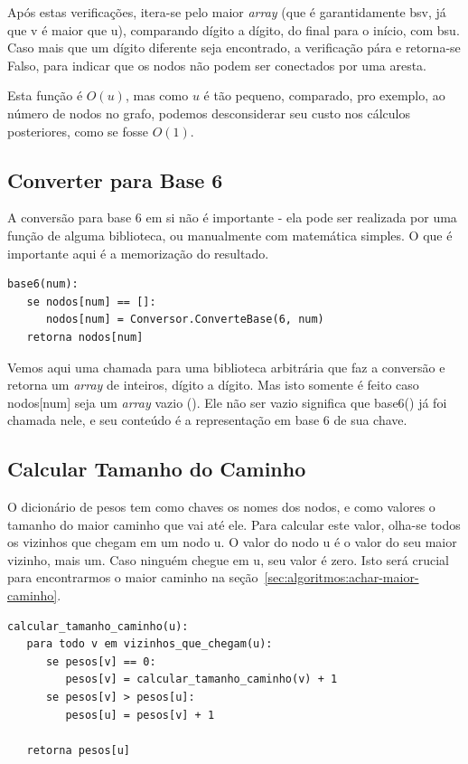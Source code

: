 \documentclass[12pt]{article}
\begin{document}
Após estas verifica\c{c}ões, itera-se pelo maior \textit{array} (que é garantidamente {\sf bsv}, já que {\sf v} é maior que {\sf u}), comparando dígito a dígito, do final para o início, com {\sf bsu}. Caso mais que um dígito diferente seja encontrado, a verifica\c{c}ão pára e retorna-se Falso, para indicar que os nodos não podem ser conectados por uma aresta.

Esta fun\c{c}ão é $O(u)$, mas como $u$ é tão pequeno, comparado, pro exemplo, ao número de nodos no grafo, podemos desconsiderar seu custo nos cálculos posteriores, como se fosse $O(1)$.

\subsection{Converter para Base 6}\label{sec:algoritmos:base6}
A conversão para base 6 em si não é importante - ela pode ser realizada por uma fun\c{c}ão de alguma biblioteca, ou manualmente com matemática simples. O que é importante aqui é a memoriza\c{c}ão do resultado.
\begin{lstlisting}
base6(num):
   se nodos[num] == []:
      nodos[num] = Conversor.ConverteBase(6, num)
   retorna nodos[num]
\end{lstlisting}

Vemos aqui uma chamada para uma biblioteca arbitrária que faz a conversão e retorna um \textit{array} de inteiros, dígito a dígito. Mas isto somente é feito caso {\sf nodos[num]} seja um \textit{array} vazio ({\sf []}). Ele não ser vazio significa que {\sf base6()} já foi chamada nele, e seu conteúdo é a representa\c{c}ão em base 6 de sua chave.

\subsection{Calcular Tamanho do Caminho}\label{sec:algoritmos:calcular-tamanho-caminhos}
O dicionário de pesos tem como chaves os nomes dos nodos, e como valores o tamanho do maior caminho que vai até ele.
Para calcular este valor, olha-se todos os vizinhos que chegam em um nodo {\sf u}. O valor do nodo {\sf u} é o valor do seu maior vizinho, mais um. Caso ninguém chegue em {\sf u}, seu valor é zero.
Isto será crucial para encontrarmos o maior caminho na se\c{c}ão~\ref{sec:algoritmos:achar-maior-caminho}.
\begin{lstlisting}
calcular_tamanho_caminho(u):
   para todo v em vizinhos_que_chegam(u):
      se pesos[v] == 0:
         pesos[v] = calcular_tamanho_caminho(v) + 1
      se pesos[v] > pesos[u]:
         pesos[u] = pesos[v] + 1

   retorna pesos[u]
\end{lstlisting}
\end{document}
